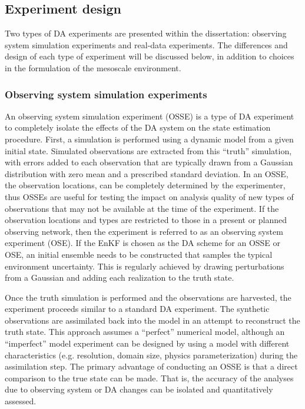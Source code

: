 \subsection{Experiment design}
Two types of DA experiments are presented within the dissertation: observing system simulation experiments and real-data experiments. The differences and design of each type of experiment will be discussed below, in addition to choices in the formulation of the mesoscale environment.

\subsubsection{Observing system simulation experiments}
An observing system simulation experiment (OSSE) is a type of DA experiment to completely isolate the effects of the DA system on the state estimation procedure. First, a simulation is performed using a dynamic model from a given initial state. Simulated observations are extracted from this “truth” simulation, with errors added to each observation that are typically drawn from a Gaussian distribution with zero mean and a prescribed standard deviation. In an OSSE, the observation locations, can be completely determined by the experimenter, thus OSSEs are useful for testing the impact on analysis quality of new types of observations that may not be available at the time of the experiment. If the observation locations and types are restricted to those in a present or planned observing network, then the experiment is referred to as an observing system experiment (OSE). If the EnKF is chosen as the DA scheme for an OSSE or OSE, an initial ensemble needs to be constructed that samples the typical environment uncertainty. This is regularly achieved by drawing perturbations from a Gaussian and adding each realization to the truth state.

Once the truth simulation is performed and the observations are harvested, the experiment proceeds similar to a standard DA experiment. The synthetic observations are assimilated back into the model in an attempt to reconstruct the truth state. This approach assumes a “perfect” numerical model, although an “imperfect” model experiment can be designed by using a model with different characteristics (e.g. resolution, domain size, physics parameterization) during the assimilation step. The primary advantage of conducting an OSSE is that a direct comparison to the true state can be made. That is, the accuracy of the analyses due to observing system or DA changes can be isolated and quantitatively assessed.

